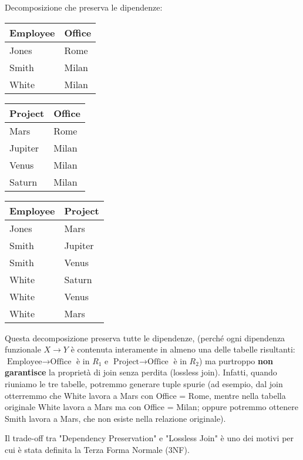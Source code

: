 	\noindent Decomposizione che preserva le dipendenze:
	\begin{center}
	\begin{tabular}{|l|l|}
		\hline
		\textbf{Employee} & \textbf{Office} \\ \hline
		Jones & Rome \\ \hline
		Smith & Milan \\ \hline
		White & Milan \\ \hline
	\end{tabular}
	\quad
	\begin{tabular}{|l|l|}
		\hline
		\textbf{Project} & \textbf{Office} \\ \hline
		Mars & Rome \\ \hline
		Jupiter & Milan \\ \hline
		Venus & Milan \\ \hline
		Saturn & Milan \\ \hline
	\end{tabular}
	\quad
	\begin{tabular}{|l|l|}
		\hline
		\textbf{Employee} & \textbf{Project} \\ \hline
		Jones & Mars \\ \hline
		Smith & Jupiter \\ \hline
		Smith & Venus \\ \hline
		White & Saturn \\ \hline
		White & Venus \\ \hline
		White & Mars \\ \hline
	\end{tabular}
	\end{center}
	
	\noindent Questa decomposizione preserva tutte le dipendenze, (perché ogni dipendenza funzionale $X \rightarrow Y$ è contenuta interamente in almeno una delle tabelle risultanti: $\text{Employee} \rightarrow \text{Office}$ è in $R_1$ e $\text{Project} \rightarrow \text{Office}$ è in $R_2$) ma purtroppo \textbf{non garantisce} la proprietà di join senza perdita (lossless join). Infatti, quando riuniamo le tre tabelle, potremmo generare tuple spurie (ad esempio, dal join otterremmo che White lavora a Mars con Office = Rome, mentre nella tabella originale White lavora a Mars ma con Office = Milan; oppure potremmo ottenere Smith lavora a Mars, che non esiste nella relazione originale).
	
	\noindent Il trade-off tra "Dependency Preservation" e "Lossless Join" è uno dei motivi per cui è stata definita la Terza Forma Normale (3NF).
	
